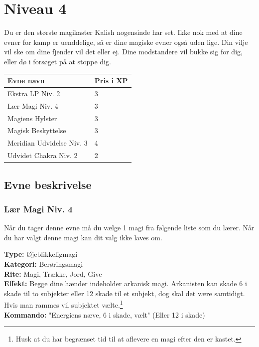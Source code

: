 \chapter{Niveau 4}
Du er den største magikaster Kalish nogensinde har set. Ikke nok med at dine evner for kamp er uenddelige, så er dine magiske evner også uden lige. Din vilje vil ske om dine fjender vil det eller ej. Dine modstandere vil bukke sig for dig, eller dø i forsøget på at stoppe dig.

\begin{table}[H]
    \centering
    \begin{tabular}{|p{}|p{}|}
    \rowcolor{cerulean!80}\hline
        Evne navn & Pris i XP \\\hline
        Ekstra LP Niv. 2 & 3 \\\hline
        Lær Magi Niv. 4 & 3 \\\hline
        Magiens Hylster  & 3 \\\hline
        Magisk Beskyttelse & 3\\\hline
        Meridian Udvidelse Niv. 3 & 4 \\\hline
        Udvidet Chakra Niv. 2 & 2 \\\hline
    \end{tabular}
\end{table}

\section{Evne beskrivelse}



\subsection{Lær Magi Niv. 4}
Når du tager denne evne må du vælge 1 magi fra følgende liste som du lærer. Når du har valgt denne magi kan dit valg ikke laves om.

\begin{lærmagi*}
\textbf{Type:} Øjeblikkeligmagi\\
\textbf{Kategori:} Berøringsmagi\\
\textbf{Rite:} Magi, Trække, Jord, Give\\
\textbf{Effekt:} Begge dine hænder indeholder arkanisk magi. Arkanisten kan skade 6 i skade til to subjekter eller 12 skade til et subjekt, dog skal det være samtidigt. Hvis man rammes vil subjektet vælte.\footnote{Husk at du har begrænset tid til at aflevere en magi efter den er kastet.}\\
\textbf{Kommando:} "Energiens næve, 6 i skade, vælt" (Eller 12 i skade)\\
\end{lærmagi*}

